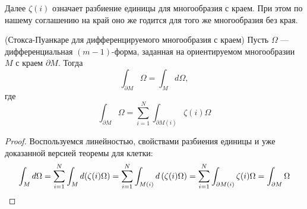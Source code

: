 \begin{note}
	Далее $\zeta(i)$ означает разбиение единицы для многообразия с краем. При этом по нашему соглашению на край оно же годится для того же многообразия без края.
\end{note}

\begin{theorem} (Стокса-Пуанкаре для дифференцируемого многообразия с краем)
	Пусть $\Omega$ --- дифференциальная $(m-1)$-форма, заданная на ориентируемом многообразии $M$ с краем $\partial M$. Тогда
	\[
		\int_{\partial M} \Omega = \int_{M} d\Omega,
	\]
	где
	\[
		\int_{\partial M} \Omega = \sum_{i=1}^N \int_{\partial M(i)} \zeta(i) \Omega
	\]
\end{theorem}

\begin{proof}
	Воспользуемся линейностью, свойствами разбиения единицы и уже доказанной версией теоремы для клетки:
	\[
		\int_{M} d\Omega = \sum_{i=1}^N \int_{M} d(\zeta(i) \Omega) = \sum_{i=1}^N \int_{M(i)} d\left(\zeta(i) \Omega\right) = \sum_{i=1}^N \int_{\partial M(i)} \zeta(i) \Omega = \int_{\partial M} \Omega
	\]
\end{proof}

